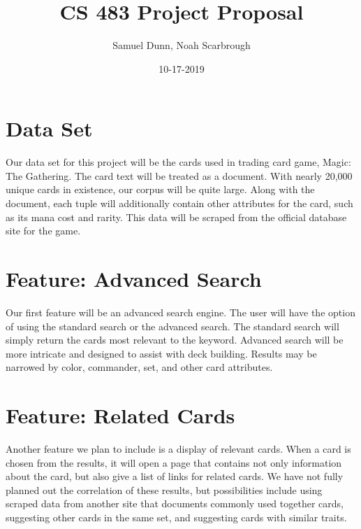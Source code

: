 \documentclass{article}
\title{CS 483 Project Proposal}
\author{Samuel Dunn, Noah Scarbrough}
\date{10-17-2019}
\begin{document}
\maketitle

\section{Data Set}
Our data set for this project will be the cards used in trading card game, Magic: The Gathering. The card text will be treated as a document. With nearly 20,000 unique cards in existence, our corpus will be quite large. Along with the document, each tuple will additionally contain other attributes for the card, such as its mana cost and rarity. This data will be scraped from the official database site for the game.

\section{Feature: Advanced Search}
Our first feature will be an advanced search engine. The user will have the option of using the standard search or the advanced search. The standard search will simply return the cards most relevant to the keyword. Advanced search will be more intricate and designed to assist with deck building. Results may be narrowed by color, commander, set, and other card attributes.

\section{Feature: Related Cards}
Another feature we plan to include is a display of relevant cards. When a card is chosen from the results, it will open a page that contains not only information about the card, but also give a list of links for related cards. We have not fully planned out the correlation of these results, but possibilities include using scraped data from another site that documents commonly used together cards, suggesting other cards in the same set, and suggesting cards with similar traits.
\end{document}
